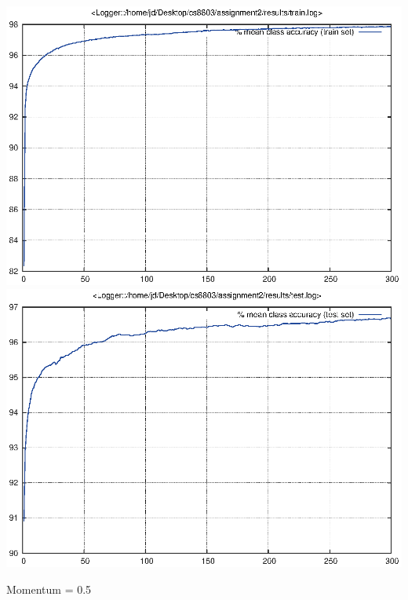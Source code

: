 \documentclass[twoside,12pt]{article}
\newcommand{\imsize}{0.5\linewidth}
\begin{document}
\includegraphics[width=\imsize]{assignment2/results/sgdwm_train}
\includegraphics[width=\imsize]{assignment2/results/sgdwm_test}

Momentum = 0.5
\end{document}
